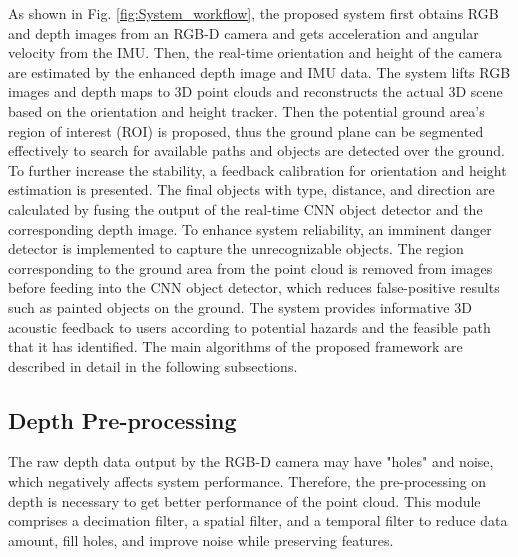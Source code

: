 \documentclass{ieeeaccess}
\begin{document}
As shown in Fig. \ref{fig:System_workflow}, the proposed system first obtains RGB and depth images from an RGB-D camera and gets acceleration and angular velocity from the IMU. Then, the real-time orientation and height of the camera are estimated by the enhanced depth image and IMU data. The system lifts RGB images and depth maps to 3D point clouds and reconstructs the actual 3D scene based on the orientation and height tracker. Then the potential ground area's region of interest (ROI) is proposed, thus the ground plane can be segmented effectively to search for available paths and objects are detected over the ground. To further increase the stability, a feedback calibration for orientation and height estimation is presented.  The final objects with type, distance, and direction are calculated by fusing the output of the real-time CNN object detector and the corresponding depth image. To enhance system reliability, an imminent danger detector is implemented to capture the unrecognizable objects. The region corresponding to the ground area from the point cloud is removed from images before feeding into the CNN object detector, which reduces false-positive results such as painted objects on the ground. The system provides informative 3D acoustic feedback to users according to potential hazards and the feasible path that it has identified. The main algorithms of the proposed framework are described in detail in the following subsections.




\subsection{Depth Pre-processing}
The raw depth data output by the RGB-D camera may have "holes" and noise, which negatively affects system performance. Therefore, the pre-processing on depth is necessary to get better performance of the point cloud. This module comprises a decimation filter, a spatial filter, and a temporal filter to reduce data amount, fill holes, and improve noise while preserving features. 
\end{document}
